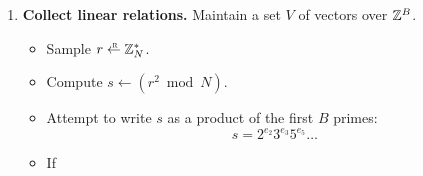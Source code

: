 \begin{enumerate}
\item \textbf{Collect linear relations.}
      Maintain a set $V$ of vectors over $\mathbb{Z}^B$.
      \begin{itemize}
          \item Sample $r \getsr \Z^*_N$.
          \item Compute $s \gets (r^2 \bmod N)$.
          \item Attempt to write $s$ as a product of the first $B$ primes:
                \[ s = 2^{e_2} 3^{e_3} 5^{e_5} \dots \]
          \item If 
      \end{itemize}

\end{enumerate}


